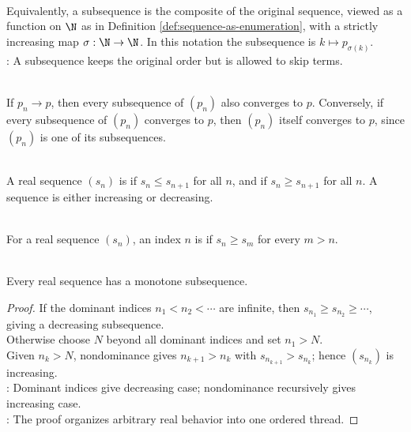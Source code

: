 \begin{remark} \label{rem:subsequence-selection-map} \\
Equivalently, a subsequence is the composite of the original sequence, viewed as a function on $\N$ as in Definition \ref{def:sequence-as-enumeration}, with a strictly increasing map $\sigma:\N\to\N$. In this notation the subsequence is $k\mapsto p_{\sigma(k)}$.\\
: A subsequence keeps the original order but is allowed to skip terms.
\end{remark}

\begin{remark} \label{rem:subsequences-of-convergent-sequences} \\
If $p_n\to p$, then every subsequence of $(p_n)$ also converges to $p$. Conversely, if every subsequence of $(p_n)$ converges to $p$, then $(p_n)$ itself converges to $p$, since $(p_n)$ is one of its subsequences.
\end{remark}

\begin{definition} \label{def:monotone-sequence} \\
A real sequence $(s_n)$ is  if $s_n\leq s_{n+1}$ for all $n$, and  if $s_n\geq s_{n+1}$ for all $n$. A  sequence is either increasing or decreasing.
\end{definition}

\begin{definition} \label{def:dominant-index} \\
For a real sequence $(s_n)$, an index $n$ is  if $s_n\geq s_m$ for every $m>n$.
\end{definition}

\begin{theorem} \label{thm:monotone-subsequence-theorem} \\
Every real sequence has a monotone subsequence.
\begin{proof}
If the dominant indices $n_1<n_2<\cdots$ are infinite, then $s_{n_1}\geq s_{n_2}\geq\cdots$, giving a decreasing subsequence.\\
Otherwise choose $N$ beyond all dominant indices and set $n_1>N$.\\
Given $n_k>N$, nondominance gives $n_{k+1}>n_k$ with $s_{n_{k+1}}>s_{n_k}$; hence $(s_{n_k})$ is increasing.\\
: Dominant indices give decreasing case; nondominance recursively gives increasing case.\\
: The proof organizes arbitrary real behavior into one ordered thread.
\end{proof}
\end{theorem}

